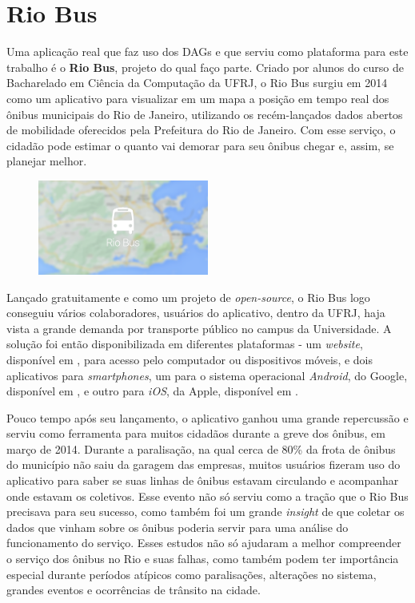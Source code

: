 \chapter{Rio Bus}\label{chp:CAP_RIOBUS}

Uma aplicação real que faz uso dos DAGs e que serviu como plataforma para este trabalho é o \textbf{Rio Bus}\cite{riobus_sc}, projeto do qual faço parte. Criado por alunos do curso de Bacharelado em Ciência da Computação da UFRJ, o Rio Bus surgiu em 2014 como um aplicativo para visualizar em um mapa a posição em tempo real dos ônibus municipais do Rio de Janeiro, utilizando os recém-lançados dados abertos de mobilidade oferecidos pela Prefeitura do Rio de Janeiro. Com esse serviço, o cidadão pode estimar o quanto vai demorar para seu ônibus chegar e, assim, se planejar melhor.


\begin{figure}
  \centering
  \includegraphics[width=0.5\textwidth]{imagens/riobus.png}
  \label{fig:LABEL_FIG_RIOBUS}
\end{figure}


Lançado gratuitamente e como um projeto de \textit{open-source}, o Rio Bus logo conseguiu vários colaboradores, usuários do aplicativo, dentro da UFRJ, haja vista a grande demanda por transporte público no campus da Universidade. A solução foi então disponibilizada em diferentes plataformas - um \textit{website}, disponível em \cite{REF_RIOBUS_WEB}, para acesso pelo computador ou dispositivos móveis, e dois aplicativos para \textit{smartphones}, um para o sistema operacional \textit{Android}, do Google, disponível em \cite{REF_RIOBUS_ANDROID}, e outro para \textit{iOS}, da Apple, disponível em \cite{REF_RIOBUS_IOS}.

Pouco tempo após seu lançamento, o aplicativo ganhou uma grande repercussão e serviu como ferramenta para muitos cidadãos durante a greve dos ônibus, em março de 2014. Durante a paralisação, na qual cerca de 80\% da frota de ônibus do município não saiu da garagem das empresas, muitos usuários fizeram uso do aplicativo para saber se suas linhas de ônibus estavam circulando e acompanhar onde estavam os coletivos. Esse evento não só serviu como a tração que o Rio Bus precisava para seu sucesso, como também foi um grande \textit{insight} de que coletar os dados que vinham sobre os ônibus poderia servir para uma análise do funcionamento do serviço. Esses estudos não só ajudaram a melhor compreender o serviço dos ônibus no Rio e suas falhas, como também podem ter importância especial durante períodos atípicos como paralisações, alterações no sistema, grandes eventos e ocorrências de trânsito na cidade.


